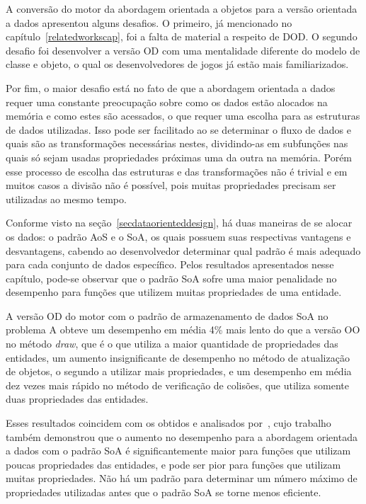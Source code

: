 A conversão do motor da abordagem orientada a objetos para a versão 
orientada a dados apresentou alguns desafios. O primeiro, já mencionado 
no capítulo~\ref{relatedworkscap}, foi a falta de material a respeito 
de DOD. O segundo desafio foi desenvolver a versão OD com uma mentalidade 
diferente do modelo de classe e objeto, o qual os desenvolvedores de 
jogos já estão mais familiarizados.

Por fim, o maior desafio está no fato de que a abordagem orientada a dados 
requer uma constante preocupação sobre como os dados estão alocados na 
memória e como estes são acessados, o que requer uma escolha para as 
estruturas de dados utilizadas. Isso pode ser facilitado ao se 
determinar o fluxo de dados e quais são as transformações necessárias 
nestes, dividindo-as em subfunções nas quais só sejam usadas propriedades 
próximas uma da outra na memória. Porém esse processo de escolha 
das estruturas e das transformações não é trivial e em muitos casos a 
divisão não é possível, pois muitas propriedades precisam ser utilizadas ao 
mesmo tempo.

Conforme visto na seção~\ref{secdataorienteddesign}, há duas maneiras de se 
alocar os dados: o padrão AoS e o SoA, os quais possuem suas respectivas 
vantagens e desvantagens, cabendo ao desenvolvedor determinar qual padrão 
é mais adequado para cada conjunto de dados específico. Pelos 
resultados apresentados nesse capítulo, pode-se observar que o 
padrão SoA sofre uma maior penalidade no desempenho para funções 
que utilizem muitas propriedades de uma entidade.

A versão OD do motor com o padrão de armazenamento de dados 
SoA no problema A obteve um desempenho em média 4\% mais lento do
que a versão OO no método \textit{draw}, que é o que utiliza a 
maior quantidade de propriedades das entidades, um aumento 
insignificante de desempenho no método de atualização de objetos, 
o segundo a utilizar mais propriedades, e um desempenho em média 
dez vezes mais rápido no método de verificação de colisões, que 
utiliza somente duas propriedades das entidades.

Esses resultados coincidem com os obtidos e analisados 
por~, cujo trabalho também demonstrou que 
o aumento no desempenho para a abordagem orientada a dados com o 
padrão SoA é significantemente maior para funções que utilizam 
poucas propriedades das entidades, e pode ser pior para funções que 
utilizam muitas propriedades. Não há um padrão para determinar 
um número máximo de propriedades utilizadas antes que o padrão 
SoA se torne menos eficiente. 

